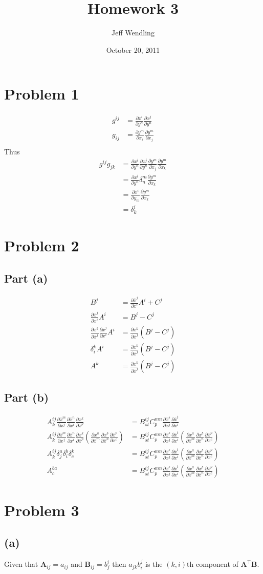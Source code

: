 \documentclass[12pt]{article}
\title{Homework 3}
\author{Jeff Wendling}
\date{October 20, 2011}
\newcommand{\eq}[1]{\begin{align*}#1\end{align*}}
\newcommand{\p}[2]{\frac{\partial#1}{\partial#2}}
\newcommand{\co}[2]{\p{x^#1}{\bar{x}^#2}}
\newcommand{\con}[2]{\p{\bar{x}^#1}{x^#2}}
\begin{document}
\maketitle
\section*{Problem 1}
\eq{
	g^{ij} &= \p{x^i}{y^n}\p{x^j}{y^n}\\
	g_{ij} &= \p{y^m}{x_i}\p{y^m}{x_j}\\
}
Thus
\eq{
	g^{ij}g_{jk} &= \p{x^i}{y^n}\p{x^j}{y^n}\p{y^m}{x_j}\p{y^m}{x_k}\\
	&= \p{x^i}{y^n}\delta_n^m\p{y^m}{x_k}\\
	&= \p{x^i}{y_m}\p{y^m}{x_k}\\
	&= \delta_k^i
}
\section*{Problem 2}
\subsection*{Part (a)}
\eq{
	B^j &= \p{\bar{x}^j}{x^i}A^i + C^j\\
	\p{\bar{x}^j}{x^i}A^i &= B^j - C^j\\
	\p{x^k}{\bar{x}^j}\p{\bar{x}^j}{x^i}A^i &= \p{x^k}{\bar{x}^j}(B^j - C^j)\\
	\delta_i^k A^i &= \p{x^k}{\bar{x}^j}(B^j - C^j)\\
	A^k &= \p{x^k}{\bar{x}^j}(B^j - C^j)
}
\subsection*{Part (b)}
\eq{
	A^{ij}_k \con{m}{j}\con{n}{i}\co{k}{p} &= B^{ij}_{st}C^{mn}_p \con{s}{j}\con{t}{i}\\
	A^{ij}_k \con{m}{j}\con{n}{i}\co{k}{p}(\co{a}{m}\co{b}{n}\con{p}{c}) &= B^{ij}_{st}C^{mn}_p \con{s}{j}\con{t}{i}(\co{a}{m}\co{b}{n}\con{p}{c})\\
	A^{ij}_k \delta^a_j\delta^b_i\delta^k_c &= B^{ij}_{st}C^{mn}_p \con{s}{j}\con{t}{i}(\co{a}{m}\co{b}{n}\con{p}{c})\\
	A^{ba}_c &= B^{ij}_{st}C^{mn}_p \con{s}{j}\con{t}{i}(\co{a}{m}\co{b}{n}\con{p}{c})
}
\section*{Problem 3}
\subsection*{(a)} Given that $\bm{A}_{ij} = a_{ij}$ and $\bm{B}_{ij} = b^i_j$ then $a_{jk}b_i^j$ is the $(k, i)$th component of $\bm{A}^\top\bm{B}$.
\end{document}
